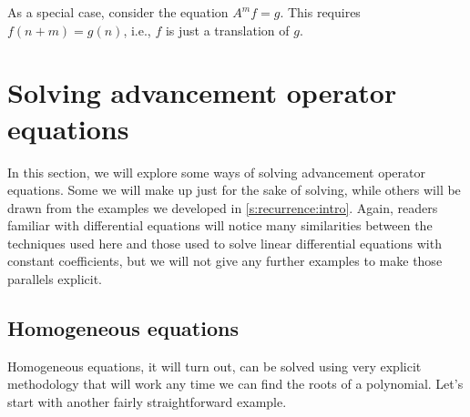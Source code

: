 As a special case, consider the equation $A^m f =g$.  This requires
$f(n+m)=g(n)$, i.e., $f$ is just a translation of $g$.

\section{Solving advancement operator
  equations}\label{s:recurrence:solving}

In this section, we will explore some ways of solving advancement
operator equations. Some we will make up just for the sake of solving,
while others will be drawn from the examples we developed in
\autoref{s:recurrence:intro}. Again, readers familiar with
differential equations will notice many similarities between the
techniques used here and those used to solve linear differential
equations with constant coefficients, but we will not give any further
examples to make those parallels explicit.

\subsection{Homogeneous equations}\label{s:recurrence:solving:homogeneous}

Homogeneous equations, it will turn out, can be solved using very
explicit methodology that will work any time we can find the roots of
a polynomial. Let's start with another fairly straightforward example.

